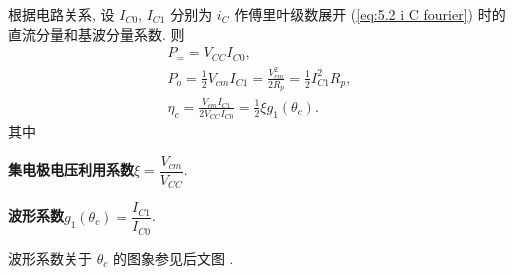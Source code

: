 根据电路关系, 设 $I_{C0}$, $I_{C1}$ 分别为 $i_C$ 作傅里叶级数展开 (\ref{eq:5.2 i C fourier}) 时的直流分量和基波分量系数. 则
\begin{gather}
    P_==V_{CC}I_{C0}, \\
    P_o=\frac{1}{2}V_{cm}I_{C1}=\frac{V_{cm}^2}{2R_p}=\frac{1}{2}I_{C1}^2R_p, \\
    \eta_c=\frac{V_{cm}I_{C1}}{2V_{CC}I_{C0}}=\frac{1}{2}\xi g_1(\theta_c).
\end{gather}
其中

\textbf{集电极电压利用系数}\quad $\xi=\dfrac{V_{cm}}{V_{CC}}$.

\textbf{波形系数}\quad $g_1(\theta_c)=\dfrac{I_{C1}}{I_{C0}}$.

波形系数关于 $\theta_c$ 的图象参见后文图 .
